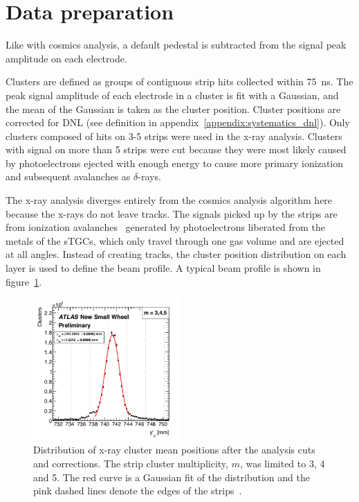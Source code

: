 \section{Data preparation}

Like with cosmics analysis, a default pedestal is subtracted from the signal peak amplitude on each electrode.

Clusters are defined as groups of contiguous strip hits collected within \SI{75}{ns}. The peak signal amplitude of each electrode in a cluster is fit with a Gaussian, and the mean of the Gaussian is taken as the cluster position. Cluster positions are corrected for DNL (see definition in appendix~\ref{appendix:systematics_dnl}). Only clusters composed of hits on 3-5 strips were used in the x-ray analysis. Clusters with signal on more than 5 strips were cut because they were most likely caused by photoelectrons ejected with enough energy to cause more primary ionization and subsequent avalanches as $\delta$-rays.

The x-ray analysis diverges entirely from the cosmics analysis algorithm here because the x-rays do not leave tracks. The signals picked up by the strips are from ionization avalanches~\cite{townsend_electricity_1915} generated by photoelectrons liberated from the metals of the sTGCs, which only travel through one gas volume and are ejected at all angles. Instead of creating tracks, the cluster position distribution on each layer is used to define the beam profile. A typical beam profile is shown in figure~\ref{fig:xray_beam_profile}.

\begin{figure}[t]
    \centering
    \includegraphics[width = 0.5\textwidth]{figures/figure_xray_beam_profile.pdf}
    \caption{Distribution of x-ray cluster mean positions after the analysis cuts and corrections. The strip cluster multiplicity, $m$, was limited to 3, 4 and 5. The red curve is a Gaussian fit of the distribution and the pink dashed lines denote the edges of the strips~\cite{lefebvre_precision_2020}.}
    \label{fig:xray_beam_profile}
\end{figure}

